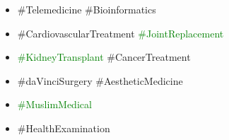\documentclass[25pt,a1paper]{tikzposter}
\begin{document}
{\begin{itemize}
{%
As a renowned university hospital with a worldwide patients, TMWH is fully committed to offering the best service available.

} %

\item \#Telemedicine \#Bioinformatics
\item \#CardiovascularTreatment \textcolor{green}{\#JointReplacement}
\item \textcolor{green}{\#KidneyTransplant} %
\#CancerTreatment
\item \#daVinciSurgery \#AestheticMedicine
\item \textcolor{green}{\#MuslimMedical}
\item \#HealthExamination
\end{itemize}
}

\end{document}
